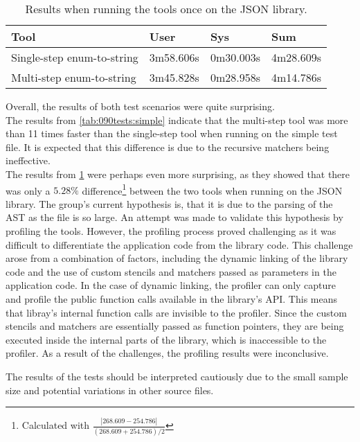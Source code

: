 \begin{table}[H]
    \centering
    \begin{tabular}{|p{}|p{}|p{}|p{}|}
    \hline
    \rowcolor{gray!30}
    \textbf{Tool} & \textbf{User} & \textbf{Sys} & \textbf{Sum} \\ \hline
    Single-step enum-to-string & 3m58.606s & 0m30.003s & 4m28.609s \\ \hline
    Multi-step enum-to-string & 3m45.828s & 0m28.958s & 4m14.786s\\ \hline
    \end{tabular}
    \caption{Results when running the tools once on the JSON library.}
    \label{tab:090tests:json}
\end{table}
\vspace*{-1em}

Overall, the results of both test scenarios were quite surprising.\\
The results from \cref{tab:090tests:simple} indicate that the multi-step tool was more than 11 times faster than the single-step tool when running on the simple test file. It is expected that this difference is due to the recursive matchers being ineffective.\\
The results from \cref{tab:090tests:json} were perhaps even more surprising, as they showed that there was only a $5.28\%$ difference\footnote{
    Calculated with $\frac{|268.609-254.786|}{(268.609+254.786)/2}$
} between the two tools when running on the JSON library.
The group's current hypothesis is, that it is due to the parsing of the AST as the file is so large.
An attempt was made to validate this hypothesis by profiling the tools. However, the profiling process proved challenging as it was difficult to differentiate the application code from the library code.
This challenge arose from a combination of factors, including the dynamic linking of the library code and the use of custom stencils and matchers passed as parameters in the application code.
In the case of dynamic linking, the profiler can only capture and profile the public function calls available in the library's API.
This means that libray's internal function calls are invisible to the profiler.
Since the custom stencils and matchers are essentially passed as function pointers, they are being executed inside the internal parts of the library, which is inaccessible to the profiler.
As a result of the challenges, the profiling results were inconclusive. 

The results of the tests should be interpreted cautiously due to the small sample size and potential variations in other source files.

